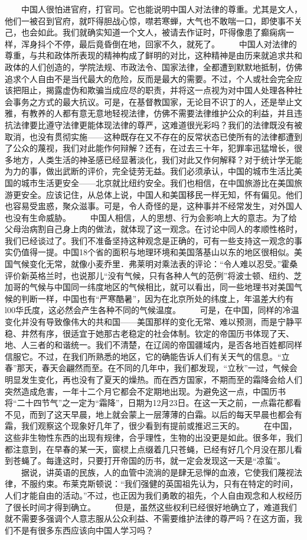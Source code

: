 \documentclass[12pt,oneside]{book}
\begin{document}
\begin{common-format}
　　中国人很怕进官府，打官司。它也能说明中国人对法律的尊重。尤其是文人，他们一被召到官府，就吓得胆战心惊，噤若寒蝉，大气也不敢喘一口，即使事不关己，也会如此。我们就确实知道一个文人，被请去作证时，吓得像患了癫痫病一样，浑身抖个不停，最后竟昏倒在地，回家不久，就死了。 
　　中国人对法律的尊重，与共和政体所表现的精神构成了鲜明的对比，这种精神是由历来就追求共和政体的人们创造的，学院法规、市政法令、国家法律，全都遭到默默地抵制，仿佛追求个人自由不是当代最大的危险，反而是最大的需要。不过，个人或社会完全应该把阻止，揭露虚伪和欺骗当成应尽的职责，并将这一点视为对中国人处理各种社会事务之方式的最大抗议。可是，在基督教国家，无论目不识丁的人，还是举止文雅，有教养的人都有意无意地轻视法律，仿佛不需要法律维护公众的利益，并且违抗法律要比遵守法律更能体现法律的尊严，这难道很光彩吗？我们的法律既没有被取消，也没有贯彻实施——这种既存在又不存在的反常状态已使所有的法律都遭到了公众的蔑视，我们对此能作何辩解？还有，在过去三十年，犯罪率迅猛增长，很多地方，人类生活的神圣感已经显著淡化，我们对此又作何解释？对于统计学无能为力的事，做出武断的评价，完全徒劳无益。我们必须承认，中国的城市生活比美国的城市生活更安全——北京就比纽约安全。我们也相信，在中国旅游比在美国旅游更安全。应该记住，从总体上说，中国人和美国移民一样无知，怀有偏见。他们也容易受盅惑，聚众滋事。可是，令人奇怪的是，这种事并不经常发生，对外国人也没有生命威胁。 
　　中国人相信，人的思想、行为会影响上大的意志。为了给父母治病割自己身上肉的做法，就体现了这一观念。在讨论中同人的孝顺性格时，我们已经谈过了。我们不准备坚持这种观念是正确的，可有一些支持这一观念的事实仍值得一提。中国18个省的面积与地理环境和美国落基山以东的地区很相似。美国气候变化无常，就像小麦乔里．弗莱明对乘法表的评论：“令人难以忍受。”霍桑评价新英格兰时，也说那儿“没有气候，只有各种人气的范例”将波士顿、纽约、芝加哥的气候与中国同一纬度地区的气候相比，就可以看出，同一些地理书对美国气候的判断一样，中国也有“严寒酷暑”，因为在北京所处的纬度上，年温差大约有l00华氏度，这必然会产生各种不同的气候温度。 
　　可是，在中国，同样的冷温变化并没有导致像伟大的共和国——美国那样的变化无常、难以预测，而是宁静平稳、井然有序，很适宜于她那古老稳定的社会体制。钦定的帝国历书体现了天、地、人三者的和谐统一。我们不清楚，在辽阔的帝国疆域内，是否各地百姓都同样信服它。不过，在我们所熟悉的地区，它的确能告诉人们有关天气的信息。“立春”那天，春天会翩然而至。在不同的几年中，我们都发现，“立秋”一过，气候会明显发生变化，再也没有了夏天的燥热。而在西方国家，不期而至的霜降会给人们突然造成危害，一年十二个月它都会不定期地出现。为避免这一点，中国历书将“二十四节气”之一定为“霜降”，日期为12月23日。在这一天之前，一点霜花都看不见，而到了这天早晨，地上就会蒙上一层薄薄的白霜。以后的每天早晨也都会有霜，我们观察这个现象好几年了，很少看到有提前或推迟三天的。 
　　在中国，这些非生物性东西的出现有规律，合乎理性，生物的出没更是如此。很多年，我们都注意到，在早春的某一天，窗棂上点缀着几只苍蝇，已经有好几个月没在那儿看到苍蝇了。每逢这时，只要打开帝国的历书，就一定会发现这一天是“凉蜇”。 
　　据说，讲英语的民族，人的血管中流淌的是肆无忌惮的血液，它使我们蔑视法律，不服约束。布莱克斯顿说：“我们强健的英国祖先认为，只有在特定的时间，人们才能自由的活动。”不过，也正因为我们勇敢的祖先，个人自由观念和人权经历了很长时间才得到确立。 
　　但是，虽然这些权利已经很好地确立了，难道我们就不需要多强调个人意志服从公众利益、不需要维护法律的尊严吗？在这方面，我们不是有很多东西应该向中国人学习吗？ 


\end{common-format}
\end{document}
